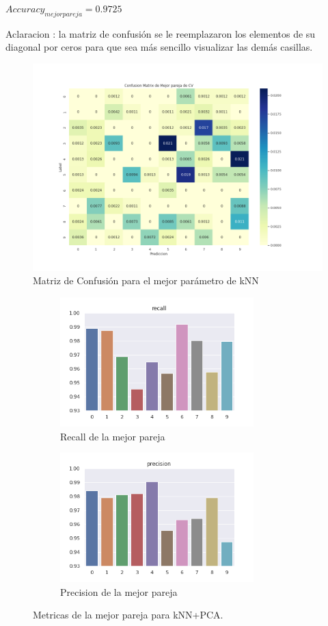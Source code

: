 \documentclass[a4paper,10pt]{article}
\begin{document}
\vspace{0.5cm}
$Accuracy_{mejor pareja} = 0.9725 $
\par
\vspace{0.5cm}
Aclaracion : la matriz de confusión se le reemplazaron los elementos de su diagonal por ceros para que sea más sencillo visualizar las demás casillas.
\begin{figure}[H]
    \centering
    \includegraphics[width=14cm]{../images/../images/ConfMatrix_knnpca.png}%
    \qquad
    \caption{Matriz de Confusión para el mejor parámetro de kNN }
    \label{knnpca_MatrizConf}%
\end{figure}

\begin{figure}[h]
\begin{subfigure}{0.5\textwidth}
\includegraphics[width=0.9\linewidth, height=5cm]{../images/recall_knnpca.png} 
\caption{Recall de la mejor pareja}
\label{fig:metpca1}
\end{subfigure}
\begin{subfigure}{0.5\textwidth}
\includegraphics[width=0.9\linewidth, height=5cm]{../images/precision_knnpca.png} 
\caption{Precision de la mejor pareja}
\label{fig:metpca2}
\end{subfigure}
\caption{Metricas de la mejor pareja para kNN+PCA.}
\label{knnpca_metricas}%
\end{figure}
\end{document}
